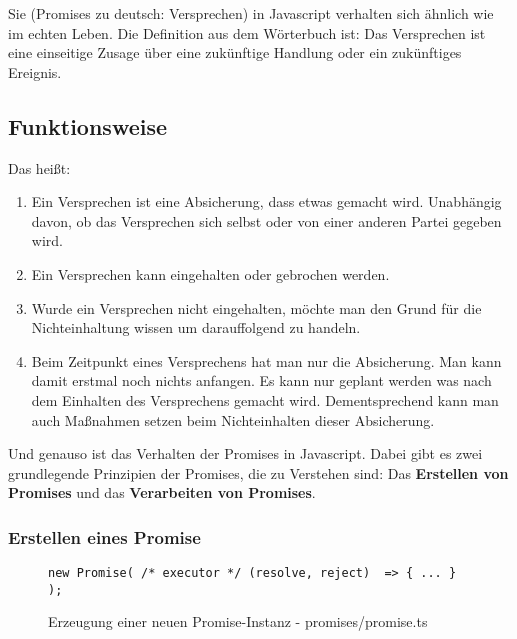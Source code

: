 \noindent
Sie (\glqq{}Promises\grqq{} zu deutsch: Versprechen) in Javascript verhalten sich ähnlich wie im echten Leben. Die Definition aus dem Wörterbuch ist: Das Versprechen ist eine einseitige Zusage über eine zukünftige Handlung oder ein zukünftiges Ereignis. \cite{versprechen} \\

\subsection{Funktionsweise}
Das heißt:

\begin{enumerate}
    \item Ein Versprechen ist eine Absicherung, dass etwas gemacht wird. Unabhängig davon, ob das Versprechen sich selbst oder von einer anderen Partei gegeben wird.
    
    \item Ein Versprechen kann eingehalten oder gebrochen werden.
    
    \item Wurde ein Versprechen nicht eingehalten, möchte man den Grund für die Nichteinhaltung wissen um darauffolgend zu handeln.
    
    \item Beim Zeitpunkt eines Versprechens hat man nur die Absicherung. Man kann damit erstmal noch nichts anfangen. Es kann nur geplant werden was nach dem Einhalten des Versprechens gemacht wird. Dementsprechend kann man auch Maßnahmen setzen beim Nichteinhalten dieser Absicherung.
    
\end{enumerate}

\noindent
Und genauso ist das Verhalten der Promises in Javascript. Dabei gibt es zwei grundlegende Prinzipien der Promises, die zu Verstehen sind: Das \textbf{Erstellen von Promises} und das \textbf{Verarbeiten von Promises}.

\subsubsection{Erstellen eines Promise}

\begin{figure}[H]
\begin{lstlisting}
new Promise( /* executor */ (resolve, reject)  => { ... } );
\end{lstlisting}
\caption{Erzeugung einer neuen Promise-Instanz - promises/promise.ts}
\end{figure}

